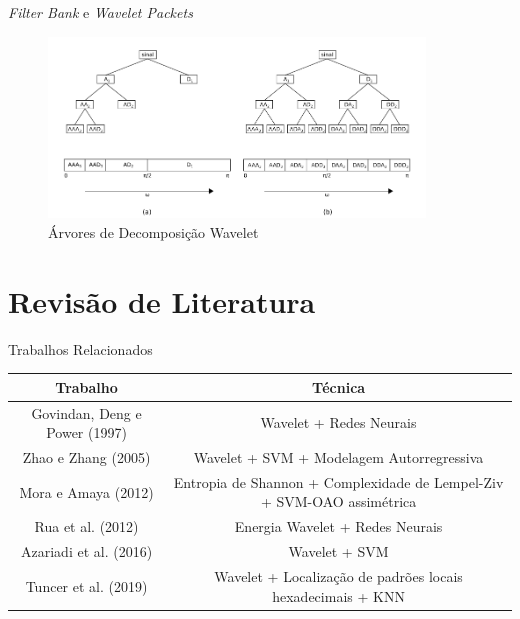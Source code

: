 \documentclass[10pt]{beamer}
\begin{document}
\begin{frame}{\textit{Filter Bank} e \textit{Wavelet Packets}}

  \begin{figure}[]
    \centering
    \includegraphics[width=10cm]{images/filterBankPacket.png}
    \caption{Árvores de Decomposição Wavelet}
  \end{figure}
\end{frame}

\section{Revisão de Literatura}

\begin{frame}{Trabalhos Relacionados}
  \begin{table}
    \begin{tabulary}{\textwidth}{|C|C|}
        \hline
        Trabalho                               & Técnica   \\ \hline
        Govindan, Deng e Power (1997)  & Wavelet + Redes Neurais                                                      \\ \hline
        Zhao e Zhang (2005)        & Wavelet + SVM  + Modelagem Autorregressiva     \\ \hline
        Mora e Amaya (2012)         & Entropia de Shannon + Complexidade de Lempel-Ziv + SVM-OAO assimétrica   \\ \hline
        Rua et al. (2012)           & Energia Wavelet + Redes Neurais                                                                                      \\ \hline
        Azariadi et al. (2016)          & Wavelet +   SVM            \\ \hline
        Tuncer et al. (2019)      & Wavelet +  Localização de padrões  locais hexadecimais +  KNN  \\ \hline
    \end{tabulary}
  \end{table}
\end{frame}
\end{document}
